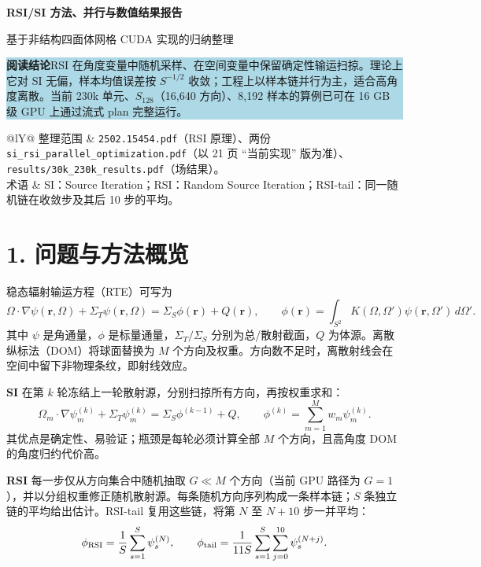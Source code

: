 \documentclass[11pt,a4paper]{article}
\newcommand{\reporttitle}[1]{{\sffamily\bfseries\fontsize{25}{31}\selectfont\color{blue}#1\par}}
\newcommand{\sectiontitle}[1]{\section{\sffamily\color{blue}#1}}
\begin{document}
\begin{titlepage}
\vspace*{28mm}
\reporttitle{RSI/SI 方法、并行与数值结果报告}
\vspace{5mm}
{\sffamily\Large 基于非结构四面体网格 CUDA 实现的归纳整理}\par
\vspace{16mm}
\colorbox{lightblue}{\parbox{0.92\linewidth}{\large
\textbf{阅读结论}\quad RSI 在角度变量中随机采样、在空间变量中保留确定性输运扫掠。理论上它对 SI 无偏，样本均值误差按 $S^{-1/2}$ 收敛；工程上以样本链并行为主，适合高角度离散。当前 230k 单元、$S_{128}$（16,640 方向）、8,192 样本的算例已可在 16 GB 级 GPU 上通过流式 plan 完整运行。}}\par
\vfill
\begin{tabularx}{\linewidth}{@{}lY@{}}
\toprule
整理范围 & \texttt{2502.15454.pdf}（RSI 原理）、两份 \texttt{si\_rsi\_parallel\_optimization.pdf}（以 21 页 ``当前实现'' 版为准）、\texttt{results/30k\_230k\_results.pdf}（场结果）。\\
术语 & SI：Source Iteration；RSI：Random Source Iteration；RSI-tail：同一随机链在收敛步及其后 10 步的平均。\\
\bottomrule
\end{tabularx}
\end{titlepage}

\sectiontitle{1. 问题与方法概览}
稳态辐射输运方程（RTE）可写为
\[
 \Omega\cdot\nabla\psi(\mathbf r,\Omega)+\Sigma_T\psi(\mathbf r,\Omega)
 =\Sigma_S\phi(\mathbf r)+Q(\mathbf r),\qquad
 \phi(\mathbf r)=\int_{S^2}K(\Omega,\Omega')\psi(\mathbf r,\Omega')\,d\Omega'.
\]
其中 $\psi$ 是角通量，$\phi$ 是标量通量，$\Sigma_T/\Sigma_S$ 分别为总/散射截面，$Q$ 为体源。离散纵标法（DOM）将球面替换为 $M$ 个方向及权重。方向数不足时，离散射线会在空间中留下非物理条纹，即射线效应。

\textbf{SI} 在第 $k$ 轮冻结上一轮散射源，分别扫掠所有方向，再按权重求和：
\[
 \Omega_m\!\cdot\!\nabla\psi_m^{(k)}+\Sigma_T\psi_m^{(k)}
 =\Sigma_S\phi^{(k-1)}+Q,\qquad
 \phi^{(k)}=\sum_{m=1}^{M}w_m\psi_m^{(k)}.
\]
其优点是确定性、易验证；瓶颈是每轮必须计算全部 $M$ 个方向，且高角度 DOM 的角度归约代价高。

\textbf{RSI} 每一步仅从方向集合中随机抽取 $G\ll M$ 个方向（当前 GPU 路径为 $G=1$），并以分组权重修正随机散射源。每条随机方向序列构成一条样本链；$S$ 条独立链的平均给出估计。RSI-tail 复用这些链，将第 $N$ 至 $N+10$ 步一并平均：
\[
 \phi_{\rm RSI}=\frac1S\sum_{s=1}^S\psi_s^{(N)},\qquad
 \phi_{\rm tail}=\frac1{11S}\sum_{s=1}^{S}\sum_{j=0}^{10}\psi_s^{(N+j)}.
\]
\end{document}
